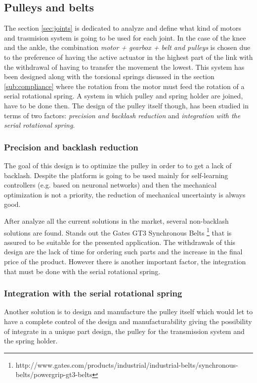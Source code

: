 \subsection{Pulleys and belts} %
\label{sub:pulleys_and_belts}
The section \ref{sec:joints} is dedicated to analyze and define what kind of motors and trasmision system is going to be used for each joint.
In the case of the knee and the ankle, the combination \textit{motor + gearbox + belt and pulleys} is chosen due to the preference of having the active actuator in the highest part of the link with the withdrawal of having to transfer the movement the lowest.
This system has been designed along with the torsional springs disussed in the section \ref{sub:compliance} where the rotation from the motor must feed the rotation of a serial rotational spring.
A system in which pulley and spring holder are joined, have to be done then.
The design of the pulley itself though, has been studied in terms of two factors: \textit{precision and backlash reduction} and \textit{integration with the serial rotational spring}.

\subsubsection{Precision and backlash reduction} %
\label{ssub:precision_and_backlash_reduction}
The goal of this design is to optimize the pulley in order to to get a lack of backlash.
Despite the platform is going to be used mainly for self-learning controllers (e.g. based on neuronal networks) and then the mechanical optimization is not a priority, the reduction of mechanical uncertainty is always good.

After analyze all the current solutions in the market, several non-backlash solutions are found.
Stands out the Gates GT3 Synchronous Belts \footnote{http://www.gates.com/products/industrial/industrial-belts/synchronous-belts/powergrip-gt3-belts} that is assured to be suitable for the presented application.
The withdrawals of this design are the lack of time for ordering such parts and the increase in the final price of the product. 
However there is another important factor, the integration that must be done with the serial rotational spring.

\subsubsection{Integration with the serial rotational spring} %
\label{ssub:integration_with_the_serial_rotational}
Another solution is to design and manufacture the pulley itself which would let to have a complete control of the design and manufacturability giving the possibility of integrate in a unique part design, the pulley for the transmission system and the spring holder.

